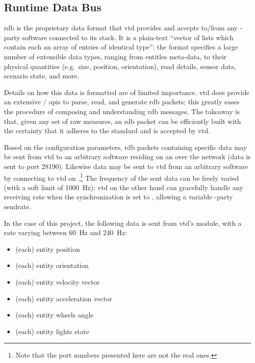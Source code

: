 \subsection{Runtime Data Bus}

\gls{rdb} is the proprietary data format that \gls{vtd} provides and accepts to/from any -party software connected to its stack. It is a plain-text \enquote{vector of lists which contain each an array of entries of identical type}{\cite{software:rdbfaqs}}: the format specifies a large number of extensible data types, ranging from entitles meta-data, to their physical quantities (e.g.\ size, position, orientation), road details, sensor data, scenario state, and more.

Details on how this data is formatted are of limited importance. \gls{vtd} does provide an extensive / \glspl{api} to parse, read, and generate \gls{rdb} \glspl{packet}; this greatly eases the procedure of composing and understanding \gls{rdb} messages. The takeaway is that, given any set of raw measures, an \gls{rdb} \gls{packet} can be efficiently built with the certainty that it adheres to the standard and is accepted by \gls{vtd}.

Based on the configuration parameters, \gls{rdb} \glspl{packet} containing specific data may be sent from \gls{vtd} to an arbitrary software residing on an  over the network (data is sent to port \num{28190}). Likewise data may be sent to \gls{vtd} from an arbitrary software by connecting to \gls{vtd} on .\footnote{Note that the port numbers presented here are not the real ones.} The frequency of the sent data can be freely varied (with a soft limit of \SI{1000}{\hertz}); \gls{vtd} on the other hand can gracefully handle any receiving rate when the synchronization is set to , allowing a variable -party sendrate. %



In the case of this project, the following data is sent from \gls{vtd}'s  module, with a rate varying between \SI{60}{\hertz} and \SI{240}{\hertz}:

\begin{itemize}
	\item (each) entity position
	\item (each) entity orientation
	\item (each) entity velocity vector
	\item (each) entity acceleration vector
	\item (each) entity wheels angle
	\item (each) entity lights state
\end{itemize}

